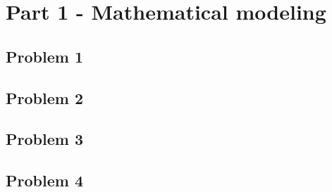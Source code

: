 
\section{Part 1 - Mathematical modeling}
\subsection{Problem 1}
\subsection{Problem 2}
\subsection{Problem 3}
\subsection{Problem 4}
